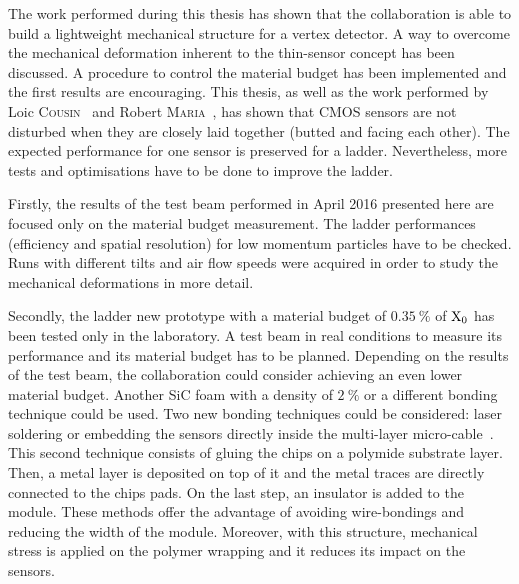 
The work performed during this thesis has shown that the collaboration is able to build a lightweight mechanical structure for a vertex detector.
A way to overcome the mechanical deformation inherent to the thin-sensor concept has been discussed.
A procedure to control the material budget has been implemented and the first results are encouraging.
This thesis, as well as the work performed by Loic \textsc{Cousin}~\cite{cousin} and Robert \textsc{Maria}~\cite{maria}, has shown that \gls{CMOS} sensors are not disturbed when they are closely laid together (butted and facing each other).
The expected performance for one sensor is preserved for a ladder.
Nevertheless, more tests and optimisations have to be done to improve the ladder.

Firstly, the results of the test beam performed in April 2016 presented here are focused only on the material budget measurement.
The ladder performances (efficiency and spatial resolution) for low momentum particles have to be checked.
Runs with different tilts and air flow speeds were acquired in order to study the mechanical deformations in more detail.

Secondly, the ladder new prototype with a material budget of $0.35~\%$ of $\rm{X_{0}}$ has been tested only in the laboratory.
A test beam in real conditions to measure its performance and its material budget has to be planned.
Depending on the results of the test beam, the collaboration could consider achieving an even lower material budget.
Another \gls{SiC} foam with a density of $2~\%$ or a different bonding technique could be used.
Two new bonding  techniques could be considered: laser soldering or embedding the sensors directly inside the multi-layer micro-cable~\cite{Baudot2012}.
This second technique consists of gluing the chips on a polymide substrate layer.
Then, a metal layer is deposited on top of it and the metal traces are directly connected to the chips pads.
On the last step, an insulator is added to the module.
These methods offer the advantage of avoiding wire-bondings and reducing the width of the module.
Moreover, with this structure, mechanical stress is applied on the polymer wrapping and it reduces its impact on the sensors.

